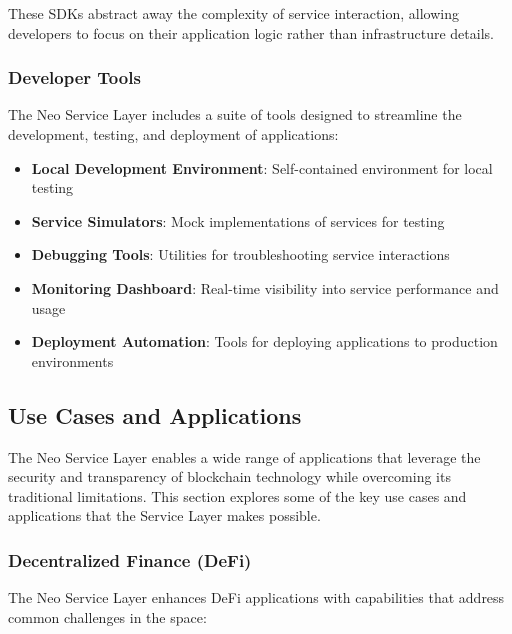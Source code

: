\documentclass{article}
\begin{document}
These SDKs abstract away the complexity of service interaction, allowing developers to focus on their application logic rather than infrastructure details.

\subsubsection{Developer Tools}
\label{subsubsec:developer-tools}

The Neo Service Layer includes a suite of tools designed to streamline the development, testing, and deployment of applications:

\begin{itemize}
    \item \textbf{Local Development Environment}: Self-contained environment for local testing
    \item \textbf{Service Simulators}: Mock implementations of services for testing
    \item \textbf{Debugging Tools}: Utilities for troubleshooting service interactions
    \item \textbf{Monitoring Dashboard}: Real-time visibility into service performance and usage
    \item \textbf{Deployment Automation}: Tools for deploying applications to production environments
\end{itemize}

\subsection{Use Cases and Applications}
\label{subsec:nsl-use-cases}

The Neo Service Layer enables a wide range of applications that leverage the security and transparency of blockchain technology while overcoming its traditional limitations. This section explores some of the key use cases and applications that the Service Layer makes possible.

\subsubsection{Decentralized Finance (DeFi)}
\label{subsubsec:defi}

The Neo Service Layer enhances DeFi applications with capabilities that address common challenges in the space:
\end{document}
